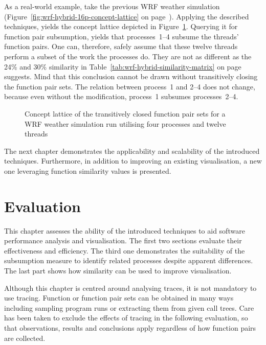 \documentclass[a4paper, final, diplominf]{zih-template}
\begin{document}
As a real-world example, take the previous WRF weather simulation (Figure~\ref{fig:wrf-hybrid-16p-concept-lattice} on page~\pageref{fig:wrf-hybrid-16p-concept-lattice}).
Applying the described techniques, yields the concept lattice depicted in Figure~\ref{fig:wrf-hybrid-16p-transitive-concept-lattice}.
Querying it for function pair subsumption, yields that processes~1--4 subsume the threads' function pairs.
One can, therefore, safely assume that these twelve threads perform a subset of the work the processes do.
They are not as different as the 24\% and 30\% similarity in Table~\ref{tab:wrf-hybrid-similarity-matrix} on page~\pageref{tab:wrf-hybrid-similarity-matrix} suggests.
Mind that this conclusion cannot be drawn without transitively closing the function pair sets.
The relation between process~1 and 2--4 does not change, because even without the modification, process~1 subsumes processes~2--4.
\begin{figure}[tb]
	\centering
	
	\caption{Concept lattice of the transitively closed function pair sets for a WRF weather simulation run utilising four processes and twelve threads}
	\label{fig:wrf-hybrid-16p-transitive-concept-lattice}
\end{figure}

The next chapter demonstrates the applicability and scalability of the introduced techniques.
Furthermore, in addition to improving an existing visualisation, a new one leveraging function similarity values is presented.

\chapter{Evaluation}
\label{sec:evaluation}
This chapter assesses the ability of the introduced techniques to aid software performance analysis and visualisation.
The first two sections evaluate their effectiveness and efficiency.
The third one demonstrates the suitability of the subsumption measure to identify related processes despite apparent differences.
The last part shows how similarity can be used to improve visualisation.

Although this chapter is centred around analysing traces, it is not mandatory to use tracing.
Function or function pair sets can be obtained in many ways including sampling program runs or extracting them from given call trees.
Care has been taken to exclude the effects of tracing in the following evaluation, so that observations, results and conclusions apply regardless of how function pairs are collected.
\end{document}
